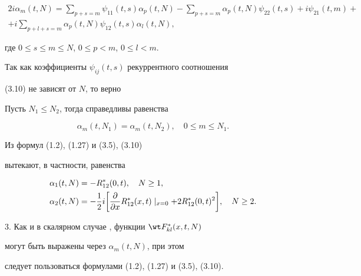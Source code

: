 \begin{multline} 


2i\alpha_m(t,N)=\sum_{p+s=m}\psi_{11}(t,s)\alpha_p(t,N)- 


\sum_{p+s=m}\alpha_p(t,N)\psi_{22}(t,s)+i\psi_{21}(t,m)+ \\


+i\sum_{p+l+s=m}\alpha_p(t,N)\psi_{12}(t,s)\alpha_l(t,N), 


\end{multline} 


где $0\le s\le m\le N$, $0\le p<m$, $0\le l<m$. 


Так как коэффициенты $\psi_{ij}(t,s)$ рекуррентного соотношения 


(3.10) не зависят от $N$, то верно 


 


\begin{stats} 


Пусть $N_1\le N_2$, тогда справедливы равенства 


$$ 


\alpha_m(t,N_1)=\alpha_m(t,N_2),\quad 0\le m\le N_1. 


$$ 


\end{stats} 


 


\begin{notes} Из формул (1.2), (1.27) и (3.5), (3.10) 


вытекают, в частности, равенства 


\begin{align*} 


\alpha_1(t,N)&=-R^*_{12}(0,t),\quad N\ge 1,\\ 


\alpha_2(t,N)&=-\frac{1}{2}i\bigg[\myfrac{}{x} 


R^*_{12}(x,t)\mid_{x=0}+2R^*_{12}(0,t)^2\bigg],\quad N\ge 2. 


\end{align*} 


\end{notes} 


 


3. Как и в скалярном случае \cite{6}, функции $\wt F^*_{kl}(x,t,N)$ 


могут быть выражены через $\alpha_m(t,N)$, при этом  


следует пользоваться формулами (1.2), (1.27) и (3.5), (3.10).


